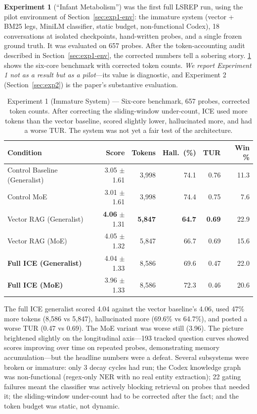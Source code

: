 \documentclass[10pt]{article}
\begin{document}
\textbf{Experiment 1} (``Infant Metabolism'') was the first full LSREP run, using the pilot environment of Section~\ref{sec:exp1-env}: the immature system (vector + BM25 legs, MiniLM classifier, static budget, non-functional Codex), 18 conversations at isolated checkpoints, hand-written probes, and a single frozen ground truth. It was evaluated on 657 probes. After the token-accounting audit described in Section~\ref{sec:exp1-env}, the corrected numbers tell a sobering story. \cref{tab:exp1} shows the six-core benchmark with corrected token counts. \emph{We report Experiment 1 not as a result but as a pilot}---its value is diagnostic, and Experiment 2 (Section~\ref{sec:exp2}) is the paper's substantive evaluation.

\begin{table}[htbp]
\centering
\small
\caption{Experiment 1 (Immature System) --- Six-core benchmark, 657 probes, corrected token counts. After correcting the sliding-window under-count, ICE used more tokens than the vector baseline, scored slightly lower, hallucinated more, and had a worse TUR. The system was not yet a fair test of the architecture.}
\label{tab:exp1}
\begin{tabular}{@{}lrrrrr@{}}
\toprule
\textbf{Condition} & \textbf{Score} & \textbf{Tokens} & \textbf{Hall.\ (\%)} & \textbf{TUR} & \textbf{Win \%} \\
\midrule
Control Baseline (Generalist) & 3.05 $\pm$ 1.61 & 3{,}998  & 74.1 & 0.76 & 11.3 \\
Control MoE                   & 3.01 $\pm$ 1.61 & 3{,}998  & 74.4 & 0.75 & 7.6  \\
Vector RAG (Generalist)       & \textbf{4.06} $\pm$ 1.31 & \textbf{5{,}847}  & \textbf{64.7} & \textbf{0.69} & 22.9 \\
Vector RAG (MoE)              & 4.05 $\pm$ 1.32 & 5{,}847  & 66.7 & 0.69 & 15.6 \\
\textbf{Full ICE (Generalist)}& 4.04 $\pm$ 1.33 & 8{,}586  & 69.6 & 0.47 & 22.0 \\
\textbf{Full ICE (MoE)}       & 3.96 $\pm$ 1.33 & 8{,}586  & 72.3 & 0.46 & 20.6 \\
\bottomrule
\end{tabular}
\end{table}

The full ICE generalist scored 4.04 against the vector baseline's 4.06, used 47\% more tokens (8{,}586 vs 5{,}847), hallucinated more (69.6\% vs 64.7\%), and posted a worse TUR (0.47 vs 0.69). The MoE variant was worse still (3.96). The picture brightened slightly on the longitudinal axis---193 tracked question curves showed scores improving over time on repeated probes, demonstrating memory accumulation---but the headline numbers were a defeat. Several subsystems were broken or immature: only 3 decay cycles had run; the Codex knowledge graph was non-functional (regex-only NER with no real entity extraction); 22 gating failures meant the classifier was actively blocking retrieval on probes that needed it; the sliding-window under-count had to be corrected after the fact; and the token budget was static, not dynamic.
\end{document}
